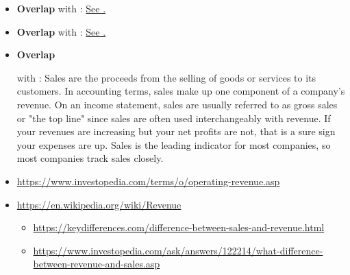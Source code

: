 \begin{itemize}[noitemsep,leftmargin=*]
    \item \textbf{Overlap} with : \hyperlink{expensevsrevenue}{See .}
    \item \textbf{Overlap} with : \hyperlink{profitvsrevenue}{See .}
    \item \hypertarget{revenuevssalesvolume}{\textbf{Overlap}} with : Sales are the proceeds from the selling of goods or services to its customers. In accounting terms, sales make up one component of a company's revenue. On an income statement, sales are usually referred to as gross sales or "the top line" since sales are often used interchangeably with revenue. If your revenues are increasing but your net profits are not, that is a sure sign your expenses are up. Sales is the leading indicator for most companies, so most companies track sales closely.
	\item \url{https://www.investopedia.com/terms/o/operating-revenue.asp}
	\item \url{https://en.wikipedia.org/wiki/Revenue}
	\begin{itemize}
    	\item \url{https://keydifferences.com/difference-between-sales-and-revenue.html}
    	\item \url{https://www.investopedia.com/ask/answers/122214/what-difference-between-revenue-and-sales.asp}
	\end{itemize}
\end{itemize}

\vspace{0.5cm}

